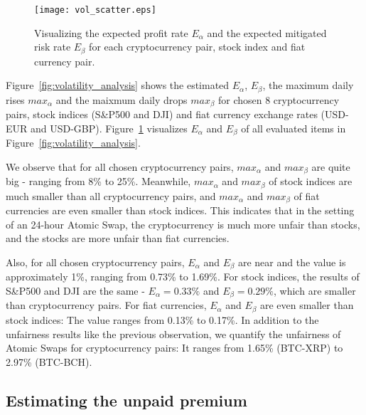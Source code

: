 \begin{figure}
    \texttt{[image: vol\_scatter.eps]}
    \caption{Visualizing the expected profit rate $E_\alpha$ and the expected mitigated risk rate $E_\beta$ for each cryptocurrency pair, stock index and fiat currency pair.}
    \label{fig:vol_scatter}
\end{figure}

Figure~\ref{fig:volatility_analysis} shows the estimated $E_\alpha$, $E_\beta$, the maximum daily rises $max_\alpha$ and the maixmum daily drops $max_\beta$ for chosen 8 cryptocurrency pairs, stock indices (S\&P500 and DJI) and fiat currency exchange rates (USD-EUR and USD-GBP).
Figure~\ref{fig:vol_scatter} visualizes $E_\alpha$ and $E_\beta$ of all evaluated items in Figure~\ref{fig:volatility_analysis}.

We observe that for all chosen cryptocurrency pairs, $max_\alpha$ and $max_\beta$ are quite big - ranging from 8\% to 25\%.
Meanwhile, $max_\alpha$ and $max_\beta$ of stock indices are much smaller than all cryptocurrency pairs,
and $max_\alpha$ and $max_\beta$ of fiat currencies are even smaller than stock indices.
This indicates that in the setting of an 24-hour Atomic Swap, the cryptocurrency is much more unfair than stocks, and the stocks are more unfair than fiat currencies.

Also, for all chosen cryptocurrency pairs, $E_{\alpha}$ and $E_{\beta}$ are near and the value is approximately 1\%, ranging from 0.73\% to 1.69\%.
For stock indices, the results of S\&P500 and DJI are the same - $E_\alpha = 0.33\%$ and $E_\beta = 0.29\%$, which are smaller than cryptocurrency pairs.
For fiat currencies, $E_\alpha$ and $E_\beta$ are even smaller than stock indices: The value ranges from 0.13\% to 0.17\%.
In addition to the unfairness results like the previous observation, we quantify the unfairness of Atomic Swaps for cryptocurrency pairs: It ranges from  1.65\% (BTC-XRP) to 2.97\% (BTC-BCH).



















\subsection{Estimating the unpaid premium}

